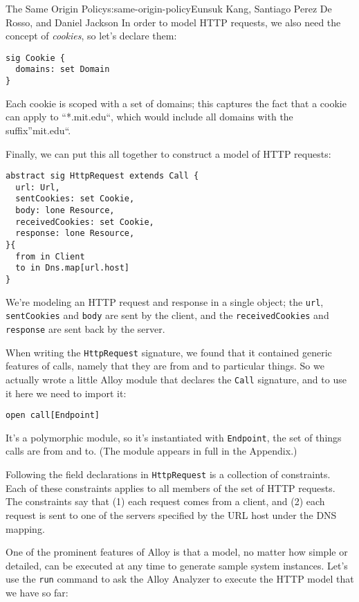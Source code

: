 \begin{aosachapter}{The Same Origin Policy}{s:same-origin-policy}{Eunsuk Kang, Santiago Perez De Rosso, and Daniel Jackson}
In order to model HTTP requests, we also need the concept of
\emph{cookies}, so let's declare them:

\begin{verbatim}
sig Cookie {
  domains: set Domain
}
\end{verbatim}

Each cookie is scoped with a set of domains; this captures the fact that
a cookie can apply to ``*.mit.edu``, which would include all domains
with the suffix''mit.edu``.

Finally, we can put this all together to construct a model of HTTP
requests:

\begin{verbatim}
abstract sig HttpRequest extends Call {
  url: Url,
  sentCookies: set Cookie,
  body: lone Resource,
  receivedCookies: set Cookie,
  response: lone Resource,
}{
  from in Client
  to in Dns.map[url.host]
}
\end{verbatim}

We're modeling an HTTP request and response in a single object; the
\texttt{url}, \texttt{sentCookies} and \texttt{body} are sent by the
client, and the \texttt{receivedCookies} and \texttt{response} are sent
back by the server.

When writing the \texttt{HttpRequest} signature, we found that it
contained generic features of calls, namely that they are from and to
particular things. So we actually wrote a little Alloy module that
declares the \texttt{Call} signature, and to use it here we need to
import it:

\begin{verbatim}
open call[Endpoint]
\end{verbatim}

It's a polymorphic module, so it's instantiated with \texttt{Endpoint},
the set of things calls are from and to. (The module appears in full in
the Appendix.)

Following the field declarations in \texttt{HttpRequest} is a collection
of constraints. Each of these constraints applies to all members of the
set of HTTP requests. The constraints say that (1) each request comes
from a client, and (2) each request is sent to one of the servers
specified by the URL host under the DNS mapping.

One of the prominent features of Alloy is that a model, no matter how
simple or detailed, can be executed at any time to generate sample
system instances. Let's use the \texttt{run} command to ask the Alloy
Analyzer to execute the HTTP model that we have so far:


\end{aosachapter}
